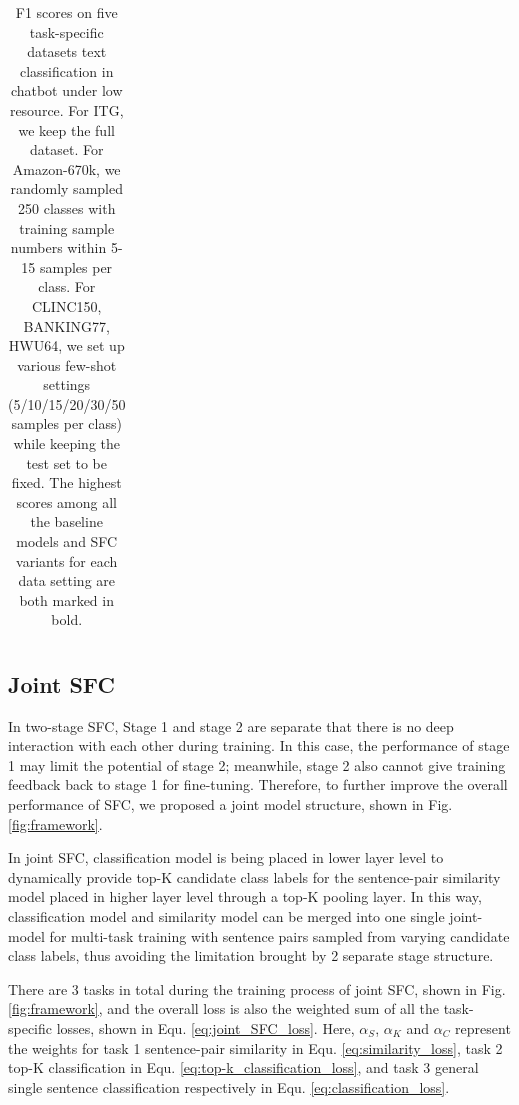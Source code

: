 \documentclass[letterpaper]{article} %
\providecommand{\tabularnewline}{\\}
\begin{document}
\begin{table}
\begin{centering}
{\begin{tabular}{|c|cccccc|cccccc|cccccc|c|c|}
          & & & & & & & & & & & & & & & & & & & &\tabularnewline
          \hline
        \end{tabular}
      }
      \par
    \end{centering}
    \caption{
      F1 scores  on  five  task-specific  datasets text classification in chatbot
      under low resource. For ITG, we keep the full dataset. For Amazon-670k, we
      randomly  sampled  250  classes  with  training sample numbers within 5-15
      samples  per  class.  For  CLINC150,  BANKING77,  HWU64, we set up various
      few-shot  settings  (5/10/15/20/30/50 samples per class) while keeping the
      test  set to be fixed. The highest scores among all the baseline models and SFC variants for each data setting are both marked
      in bold.
    }
    \label{tbe:table2}
  \end{table}



  \subsection{Joint SFC}
  In  two-stage  SFC,  Stage  1  and  stage 2 are separate that there is no deep
  interaction  with each other during training. In this case, the performance of
  stage  1  may  limit  the potential of stage 2; meanwhile, stage 2 also cannot
  give  training feedback back to stage 1 for fine-tuning. Therefore, to further
  improve  the  overall performance of SFC, we proposed a joint model structure,
  shown in Fig. \ref{fig:framework}.

  In  joint  SFC,  classification  model is being placed in lower layer level to
  dynamically  provide  top-K  candidate  class  labels  for  the  sentence-pair
  similarity  model  placed in higher layer level through a top-K pooling layer.
  In  this way, classification model and similarity model can be merged into one
  single  joint-model  for  multi-task training with sentence pairs sampled from
  varying  candidate  class  labels,  thus  avoiding the limitation brought by 2
  separate stage structure.

  There  are 3 tasks in total during the training process of joint SFC, shown in
  Fig. \ref{fig:framework}, and the overall loss is also the weighted sum of all
  the   task-specific  losses,  shown  in  Equ.  \ref{eq:joint_SFC_loss}.  Here,
  $\alpha_S$,  $\alpha_K$  and  $\alpha_C$  represent  the  weights  for  task 1
  sentence-pair  similarity  in  Equ.  \ref{eq:similarity_loss},  task  2  top-K
  classification  in Equ. \ref{eq:top-k_classification_loss}, and task 3 general
  single       sentence       classification      respectively      in      Equ.
  \ref{eq:classification_loss}.
\end{document}
